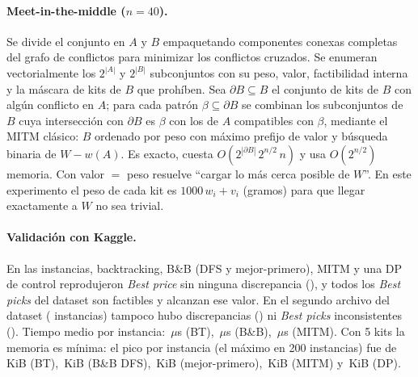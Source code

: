 \documentclass[11pt]{article}
\theoremstyle{remark}
\begin{document}
\paragraph{Meet-in-the-middle ($n=40$).} Se divide el conjunto en $A$ y $B$ empaquetando componentes
conexas completas del grafo de conflictos para minimizar los conflictos cruzados. Se enumeran
vectorialmente los $2^{|A|}$ y $2^{|B|}$ subconjuntos con su peso, valor, factibilidad interna y la
máscara de kits de $B$ que prohíben. Sea $\partial B\subseteq B$ el conjunto de kits de $B$ con algún
conflicto en $A$; para cada patrón $\beta\subseteq\partial B$ se combinan los subconjuntos de $B$ cuya
intersección con $\partial B$ es $\beta$ con los de $A$ compatibles con $\beta$, mediante el MITM
clásico: $B$ ordenado por peso con máximo prefijo de valor y búsqueda binaria de $W-w(A)$. Es exacto,
cuesta $O(2^{|\partial B|}\,2^{n/2}\,n)$ y usa $O(2^{n/2})$ memoria. Con valor $=$ peso resuelve
``cargar lo más cerca posible de $W$''. En este experimento el peso de cada kit es
$1000\,w_i+v_i$ (gramos) para que llegar exactamente a $W$ no sea trivial.

\paragraph{Validación con Kaggle.} En las \kagInst{} instancias, backtracking, B\&B (DFS y
mejor-primero), MITM y una DP de control reprodujeron \emph{Best price} sin ninguna discrepancia
(\kagDisc), y todos los \emph{Best picks} del dataset son factibles y alcanzan ese valor. En el
segundo archivo del dataset (\kagNewInst{} instancias) tampoco hubo discrepancias (\kagNewDisc) ni
\emph{Best picks} inconsistentes (\kagNewPicks). Tiempo medio
por instancia: \kagTBt\,$\mu$s (BT), \kagTBnb\,$\mu$s (B\&B), \kagTMitm\,$\mu$s (MITM). Con 5 kits la
memoria es mínima: el pico por instancia (el máximo en 200 instancias) fue de \kagMemBt\,KiB (BT),
\kagMemBnb\,KiB (B\&B DFS), \kagMemBest\,KiB (mejor-primero), \kagMemMitm\,KiB (MITM) y \kagMemDp\,KiB (DP).
\end{document}

